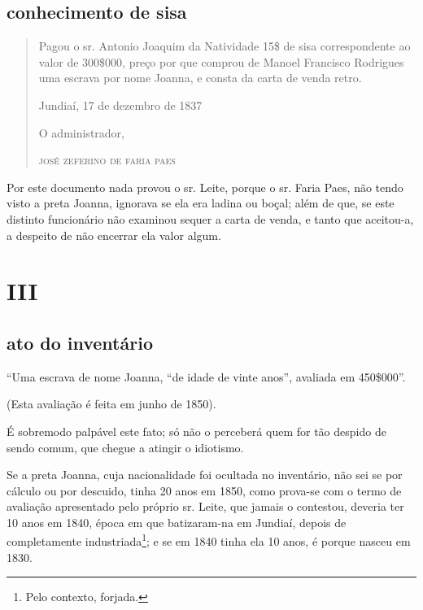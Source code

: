 {\subsection{conhecimento de sisa\protect\footnotemark}


\begin{quote}
Pagou o sr. Antonio Joaquim da Natividade 15\$ de sisa correspondente
ao valor de 300\$000, preço por que comprou de Manoel Francisco
Rodrigues uma escrava por nome Joanna, e consta da carta de venda
retro.

\begin{flushright}
Jundiaí, 17 de dezembro de 1837

O administrador,

\textsc{josé zeferino de faria paes}
\end{flushright}
\end{quote}

Por este documento nada provou o sr. Leite, porque o sr. Faria Paes, não
tendo visto a preta Joanna, ignorava se ela era ladina ou boçal; além de
que, se este distinto funcionário não examinou sequer a carta de venda,
e tanto que aceitou-a, a despeito de não encerrar ela valor algum.

\section{III}

\subsection{ato do inventário}

``Uma escrava de nome Joanna, ``de idade de vinte anos'', avaliada em
450\$000''.

(Esta avaliação é feita em junho de 1850).

É sobremodo palpável este fato; só não o perceberá quem for tão despido
de sendo comum, que chegue a atingir o idiotismo.

Se a preta Joanna, cuja nacionalidade foi ocultada no inventário, não
sei se por cálculo ou por descuido, tinha 20 anos em 1850, como prova-se
com o termo de avaliação apresentado pelo próprio sr. Leite, que jamais
o contestou, deveria ter 10 anos em 1840, época em que batizaram-na em
Jundiaí, depois de completamente industriada\footnote{ Pelo contexto,
  forjada.}; e se em 1840 tinha ela 10 anos, é porque nasceu em 1830.

}
